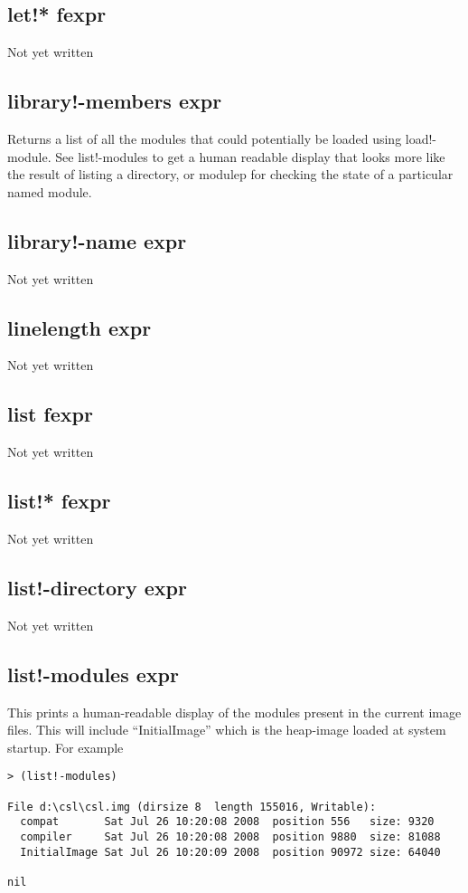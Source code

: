 \documentclass[a4paper,11pt]{article}
\begin{document}
\subsection{\ttfamily let!* fexpr}
Not yet written

\subsection{\ttfamily library!-members expr}
Returns a list of all the modules that could potentially be loaded using
{\ttfamily load!-module}. See {\ttfamily list!-modules} to get a human
readable display that looks more like the result of listing a directory, or
{\ttfamily modulep} for checking the state of a particular named module.

\subsection{\ttfamily library!-name expr}
Not yet written

\subsection{\ttfamily linelength expr}
Not yet written

\subsection{\ttfamily list fexpr}
Not yet written

\subsection{\ttfamily list!* fexpr}
Not yet written

\subsection{\ttfamily list!-directory expr}
Not yet written


\subsection{\ttfamily list!-modules expr}
This prints a human-readable display of the modules present in the current
image files. This will include ``InitialImage'' which is the heap-image
loaded at system startup. For example
\begin{verbatim}
> (list!-modules)

File d:\csl\csl.img (dirsize 8  length 155016, Writable):
  compat       Sat Jul 26 10:20:08 2008  position 556   size: 9320
  compiler     Sat Jul 26 10:20:08 2008  position 9880  size: 81088
  InitialImage Sat Jul 26 10:20:09 2008  position 90972 size: 64040

nil
\end{verbatim}
\end{document}
